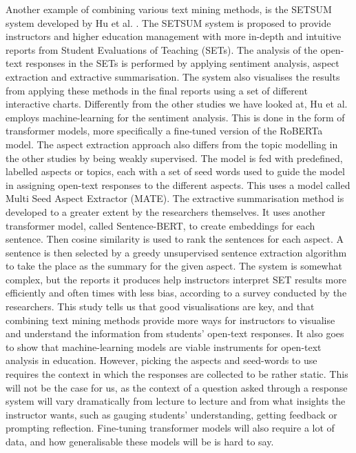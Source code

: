 Another example of combining various text mining methods, is the SETSUM system developed by Hu et al. \cite{setsum2022}. The SETSUM system is proposed to provide instructors and higher education management with more in-depth and intuitive reports from Student Evaluations of Teaching (SETs). The analysis of the open-text responses in the SETs is performed by applying sentiment analysis, aspect extraction and extractive summarisation. The system also visualises the results from applying these methods in the final reports using a set of different interactive charts. Differently from the other studies we have looked at, Hu et al. employs machine-learning for the sentiment analysis. This is done in the form of transformer models, more specifically a fine-tuned version of the RoBERTa model. The aspect extraction approach also differs from the topic modelling in the other studies by being weakly supervised. The model is fed with predefined, labelled aspects or topics, each with a set of seed words used to guide the model in assigning open-text responses to the different aspects. This uses a model called Multi Seed Aspect Extractor (MATE). The extractive summarisation method is developed to a greater extent by the researchers themselves. It uses another transformer model, called Sentence-BERT, to create embeddings for each sentence. Then cosine similarity is used to rank the sentences for each aspect. A sentence is then selected by a greedy unsupervised sentence extraction algorithm to take the place as the summary for the given aspect. The system is somewhat complex, but the reports it produces help instructors interpret SET results more efficiently and often times with less bias, according to a survey conducted by the researchers. This study tells us that good visualisations are key, and that combining text mining methods provide more ways for instructors to visualise and understand the information from students' open-text responses. It also goes to show that machine-learning models are viable instruments for open-text analysis in education. However, picking the aspects and seed-words to use requires the context in which the responses are collected to be rather static. This will not be the case for us, as the context of a question asked through a response system will vary dramatically from lecture to lecture and from what insights the instructor wants, such as gauging students' understanding, getting feedback or prompting reflection. Fine-tuning transformer models will also require a lot of data, and how generalisable these models will be is hard to say.

